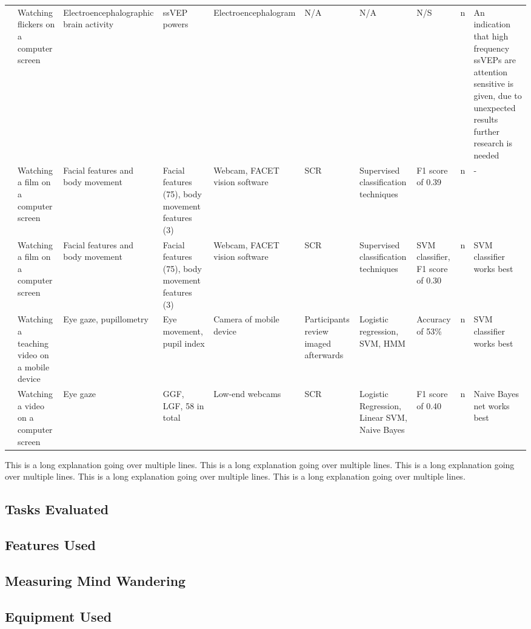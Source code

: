 \begin{sidewaystable}
\begin{table}[H]
\begin{threeparttable}
\begin{tabulary}{\textheight}{LLLLLLLLLL}
\cite{Russell2016MonitoringEnvironments} & Watching flickers on a computer screen & Electroencephalographic brain activity & ssVEP powers & Electroencephalogram & N/A & N/A & N/S & n & An indication that high frequency ssVEPs are attention sensitive is given, due to unexpected results further research is needed\\
\cite{Stewart2017FaceComprehension}     & Watching a film on a computer screen & Facial features and body movement & Facial features (75), body movement features (3) & Webcam, FACET vision software & SCR & Supervised classification techniques & F1 score of 0.39 & n & -\\
\cite{Stewart2016WheresViewing}         & Watching a film on a computer screen & Facial features and body movement & Facial features (75), body movement features (3) & Webcam, FACET vision software & SCR & Supervised classification techniques & SVM classifier, F1 score of 0.30 & n & SVM classifier works best\\
\cite{ISI:000443429900018}              & Watching a teaching video on a mobile device & Eye gaze, pupillometry & Eye movement, pupil index & Camera of mobile device & Participants review imaged afterwards & Logistic regression, SVM, HMM & Accuracy of 53\% & n & SVM classifier works best\\
\cite{Zhao2017ScalableApproach}         & Watching a video on a computer screen & Eye gaze & GGF, LGF, 58 in total & Low-end webcams & SCR & Logistic Regression, Linear SVM, Naive Bayes & F1 score of 0.40 & n & Naive Bayes net works best\\
\bottomrule
\end{tabulary}
\begin{tablenotes}\footnotesize
    \note This is a long explanation going over multiple lines. This is a long explanation going over multiple lines. This is a long explanation going over multiple lines. This is a long explanation going over multiple lines. This is a long explanation going over multiple lines.
\end{tablenotes}
\end{threeparttable}
\end{table}
\end{sidewaystable}
\twocolumn

\subsection{Tasks Evaluated}

\subsection{Features Used}

\subsection{Measuring Mind Wandering}

\subsection{Equipment Used}
\lipsum